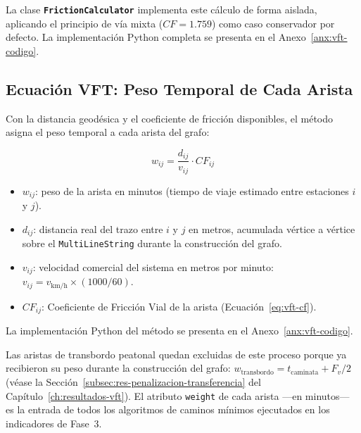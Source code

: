 La clase \texttt{\textbf{FrictionCalculator}} implementa este cálculo de forma aislada, aplicando el principio de vía mixta ($CF = 1.759$) como caso conservador por defecto. La implementación Python completa se presenta en el Anexo~\ref{anx:vft-codigo}.

\subsection{Ecuación VFT: Peso Temporal de Cada Arista}
\label{subsec:vft-ecuacion}

Con la distancia geodésica y el coeficiente de fricción disponibles, el método
 asigna el peso temporal a cada arista del grafo:

\begin{equation}
    w_{ij} = \frac{d_{ij}}{v_{ij}} \cdot CF_{ij}
    \label{eq:vft-peso}
\end{equation}

\begin{itemize}
    \item $w_{ij}$: peso de la arista en minutos (tiempo de viaje estimado entre
    estaciones $i$ y $j$).
    \item $d_{ij}$: distancia real del trazo entre $i$ y $j$ en metros, acumulada
    vértice a vértice sobre el \texttt{MultiLineString} durante la construcción
    del grafo.
    \item $v_{ij}$: velocidad comercial del sistema en metros por minuto:
    $v_{ij} = v_{\text{km/h}} \times (1000/60)$.
    \item $CF_{ij}$: Coeficiente de Fricción Vial de la arista
    (Ecuación~\ref{eq:vft-cf}).
\end{itemize}

La implementación Python del método  se presenta en el Anexo~\ref{anx:vft-codigo}.

Las aristas de transbordo peatonal quedan excluidas de este proceso porque
ya recibieron su peso durante la construcción del grafo:
$w_{\text{transbordo}} = t_{\text{caminata}} + F_v / 2$ (véase la
Sección~\ref{subsec:res-penalizacion-transferencia} del Capítulo~\ref{ch:resultados-vft}).
El atributo \texttt{weight} de cada arista —en minutos— es la entrada de todos
los algoritmos de caminos mínimos ejecutados en los indicadores de Fase~3.

